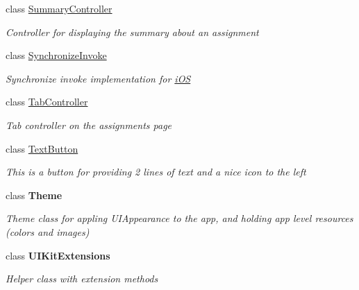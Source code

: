 \begin{DoxyCompactItemize}
class \hyperlink{class_field_service_1_1i_o_s_1_1_summary_controller}{Summary\+Controller}
\begin{DoxyCompactList}\small\item\em Controller for displaying the summary about an assignment \end{DoxyCompactList}\item 
class \hyperlink{class_field_service_1_1i_o_s_1_1_synchronize_invoke}{Synchronize\+Invoke}
\begin{DoxyCompactList}\small\item\em Synchronize invoke implementation for \hyperlink{namespace_field_service_1_1i_o_s}{i\+O\+S} \end{DoxyCompactList}\item 
class \hyperlink{class_field_service_1_1i_o_s_1_1_tab_controller}{Tab\+Controller}
\begin{DoxyCompactList}\small\item\em Tab controller on the assignments page \end{DoxyCompactList}\item 
class \hyperlink{class_field_service_1_1i_o_s_1_1_text_button}{Text\+Button}
\begin{DoxyCompactList}\small\item\em This is a button for providing 2 lines of text and a nice icon to the left \end{DoxyCompactList}\item 
class {\bfseries Theme}
\begin{DoxyCompactList}\small\item\em Theme class for appling U\+I\+Appearance to the app, and holding app level resources (colors and images) \end{DoxyCompactList}\item 
class {\bfseries U\+I\+Kit\+Extensions}
\begin{DoxyCompactList}\small\item\em Helper class with extension methods \end{DoxyCompactList}\end{DoxyCompactItemize}
